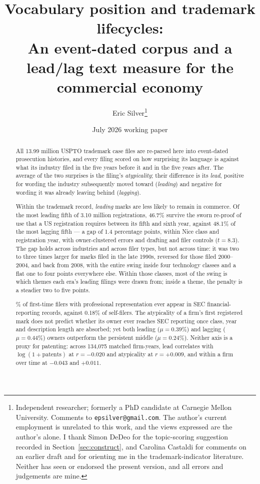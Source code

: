 \documentclass[11pt]{article}
\title{\bfseries Vocabulary position and trademark lifecycles:\\
\large An event-dated corpus and a lead/lag text measure for the commercial economy}
\author{Eric Silver\thanks{Independent researcher; formerly a PhD candidate at Carnegie Mellon University. Comments to \texttt{epsilver@gmail.com}. The author's current employment is unrelated to this work, and the views expressed are the author's alone. I thank Simon DeDeo for the topic-scoring suggestion recorded in Section~\ref{sec:construct}, and Carolina Castaldi for comments on an earlier draft and for orienting me in the trademark-indicator literature. Neither has seen or endorsed the present version, and all errors and judgements are mine.}}
\date{July 2026 working paper}
\begin{document}
\maketitle

\begin{abstract}
\noindent All 13.99
million USPTO trademark case files are re-parsed here into event-dated
prosecution histories, and every filing scored on how surprising its language
is against what its industry filed in the five years before it and in the five
years after. The average of the two surprises is the filing's
\emph{atypicality}; their difference is its \emph{lead}, positive for wording
the industry subsequently moved toward (\emph{leading}) and negative for
wording it was already leaving behind (\emph{lagging}).

\noindent Within the trademark record, \emph{leading} marks are less likely to
remain in commerce. Of the most leading fifth of 3.10 million registrations,
46.7\% survive the sworn re-proof of use that a US registration requires
between its fifth and sixth year, against 48.1\% of the most lagging fifth ---
a gap of 1.4 percentage points, within Nice class and registration year, with owner-clustered
errors and drafting and filer controls ($t = 8.3$). The gap holds across
industries and across
filer types, but not across time: it was two to three times larger for marks
filed in the late 1990s, reversed for those filed 2000--2004, and back from
2008, with the entire swing inside four technology classes and a flat one to
four points everywhere else. Within those classes, most of the swing is which
themes each era's leading filings were drawn from; inside a theme, the
penalty is a steadier two to five points.

\% of first-time filers with professional representation ever
appear in SEC financial-reporting records, against 0.18\% of self-filers. The
atypicality of a firm's first registered mark does not predict whether its
owner ever reaches SEC reporting once class, year and description length are
absorbed; yet both leading ($\mu = 0.39$\%) and lagging ($\mu = 0.44$\%)
owners outperform the persistent middle ($\mu = 0.24$\%). Neither axis is a proxy for
patenting: across 134{,}075 matched firm-years, lead correlates with
$\log(1+\mathrm{patents})$ at $r = -0.020$ and atypicality at $r = +0.009$,
and within a firm over time at $-0.043$ and $+0.011$.


\end{abstract}
\end{document}
